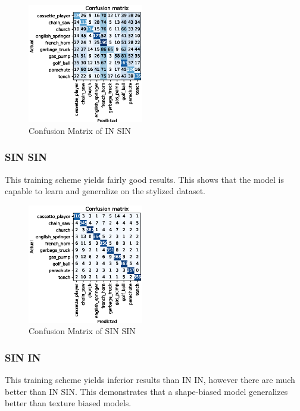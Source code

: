 \documentclass{article}
\begin{document}
\begin{figure}[h!]
  \includegraphics[width = 0.45\textwidth]{imgs/in/in-sin/in-sin_confusion_matrix_0.313.eps}
  \caption{Confusion Matrix of IN \texorpdfstring{\textrightarrow} .SIN}
  \label{cm_in-sin}
\end{figure}

\subsubsection{SIN \texorpdfstring{\textrightarrow} .SIN}
This training scheme yields fairly good results. This shows that the model is capable to learn
and generalize on the stylized dataset.

\begin{figure}[h!]
  \includegraphics[width = 0.45\textwidth]{imgs/sin/sin-sin/sin-sin_confusion_matrix_0.908.eps}
  \caption{Confusion Matrix of SIN \texorpdfstring{\textrightarrow} .SIN}
  \label{cm_sin-sin}
\end{figure}

\subsubsection{SIN \texorpdfstring{\textrightarrow} .IN}

This training scheme yields inferior results than IN \texorpdfstring{\textrightarrow} IIN, however
there are much better than IN \texorpdfstring{\textrightarrow} .SIN.
This demonstrates that a shape-biased model generalizes better than texture biased models.
\end{document}
